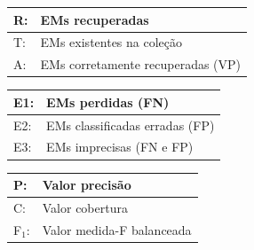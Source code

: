 \documentclass[25pt, a2papper, portrait]{tikzposter}
\begin{document}
\begin{columns}
{      \begin{center}
      \begin{tabular}{| l | l |}
        \arrayrulecolor{white}\hline
        R: & EMs recuperadas \\ \hline
        T: & EMs existentes na coleção \\ \hline
        A: & EMs corretamente recuperadas (VP) \\ \hline
      \end{tabular}
      \begin{tabular}{| l | l |}
        \arrayrulecolor{white}\hline
        E1: & EMs perdidas (FN) \\ \hline
        E2: & EMs classificadas erradas (FP) \\ \hline
        E3: & EMs imprecisas (FN e FP) \\ \hline
      \end{tabular}
      \begin{tabular}{| l | l |}
        \arrayrulecolor{white}\hline
        P: & Valor precisão \\ \hline
        C: & Valor cobertura \\ \hline
        F$_1$: & Valor medida-F balanceada \\ \hline
      \end{tabular}
      \end{center}

      \vspace*{-0.6cm}
    }

\end{columns}
\end{document}
